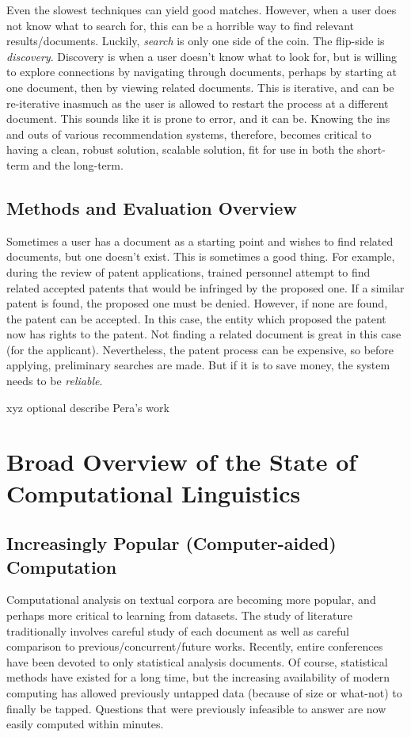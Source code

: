 Even the slowest techniques can yield good matches. However, when a user does not know what to search for, this can be a horrible way to find relevant results/documents. Luckily, \emph{search} is only one side of the coin. The flip-side is \emph{discovery}. Discovery is when a user doesn't know what to look for, but is willing to explore connections by navigating through documents, perhaps by starting at one document, then by viewing related documents. This is iterative, and can be re-iterative inasmuch as the user is allowed to restart the process at a different document. This sounds like it is prone to error, and it can be. Knowing the ins and outs of various recommendation systems, therefore, becomes critical to having a clean, robust solution, scalable solution, fit for use in both the short-term and the long-term.

\subsection {Methods and Evaluation Overview}
Sometimes a user has a document as a starting point and wishes to find related documents, but one doesn't exist. This is sometimes a good thing. For example, during the review of patent applications, trained personnel attempt to find related accepted patents that would be infringed by the proposed one. If a similar patent is found, the proposed one must be denied. However, if none are found, the patent can be accepted. In this case, the entity which proposed the patent now has rights to the patent. Not finding a related document is great in this case (for the applicant). Nevertheless, the patent process can be expensive, so before applying, preliminary searches are made. But if it is to save money, the system needs to be \emph{reliable}.


xyz optional describe Pera's work 

\section {Broad Overview of the State of Computational Linguistics}
\subsection {Increasingly Popular (Computer-aided) Computation}
Computational analysis on textual corpora are becoming more popular, and perhaps more critical to learning from datasets. The study of literature traditionally involves careful study of each document as well as careful comparison to previous/concurrent/future works. Recently, entire conferences have been devoted to only statistical analysis documents. Of course, statistical methods have existed for a long time, but the increasing availability of modern computing has allowed previously untapped data (because of size or what-not) to finally be tapped. Questions that were previously infeasible to answer are now easily computed within minutes.
